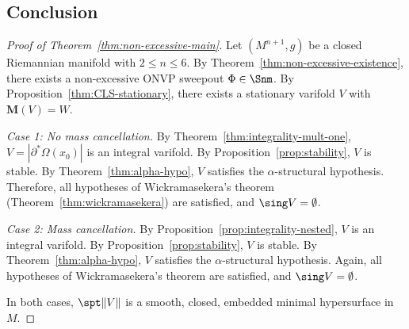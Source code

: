 \subsection{Conclusion}\label{subsec:regularity-conclusion}

\begin{proof}[Proof of Theorem~\ref{thm:non-excessive-main}]
Let $(M^{n+1}, g)$ be a closed Riemannian manifold with $2 \leq n \leq 6$. By Theorem~\ref{thm:non-excessive-existence}, there exists a non-excessive ONVP sweepout $\Phi \in \Snm$. By Proposition~\ref{thm:CLS-stationary}, there exists a stationary varifold $V$ with $\mathbf{M}(V) = W$.

\medskip\noindent\emph{Case 1: No mass cancellation.}
By Theorem~\ref{thm:integrality-mult-one}, $V = |\partial^*\Omega(x_0)|$ is an integral varifold. By Proposition~\ref{prop:stability}, $V$ is stable. By Theorem~\ref{thm:alpha-hypo}, $V$ satisfies the $\alpha$-structural hypothesis. Therefore, all hypotheses of Wickramasekera's theorem (Theorem~\ref{thm:wickramasekera}) are satisfied, and $\sing V = \emptyset$.

\medskip\noindent\emph{Case 2: Mass cancellation.}
By Proposition~\ref{prop:integrality-nested}, $V$ is an integral varifold. By Proposition~\ref{prop:stability}, $V$ is stable. By Theorem~\ref{thm:alpha-hypo}, $V$ satisfies the $\alpha$-structural hypothesis. Again, all hypotheses of Wickramasekera's theorem are satisfied, and $\sing V = \emptyset$.

\medskip
In both cases, $\spt\|V\|$ is a smooth, closed, embedded minimal hypersurface in $M$.
\end{proof}
